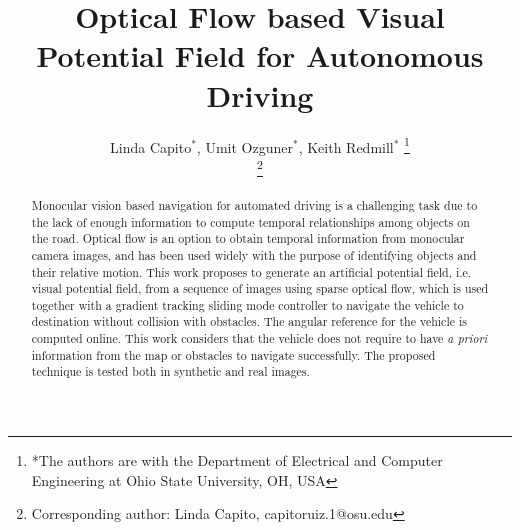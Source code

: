 \documentclass[letterpaper, 10 pt, conference]{ieeeconf}  %
\title{\LARGE \bf
Optical Flow based Visual Potential Field for Autonomous Driving}
\author{
Linda Capito$^*$, Umit Ozguner$^*$, Keith Redmill$^*$
\thanks{*The authors are with the Department of Electrical and Computer Engineering at Ohio State University, OH, USA} \\
\thanks{Corresponding author: Linda Capito, capitoruiz.1@osu.edu}}
\begin{document}
\maketitle
\thispagestyle{empty}
\pagestyle{empty}

\begin{abstract}

Monocular vision based navigation for automated driving is a challenging task due to the lack of enough information to compute temporal relationships among objects on the road. Optical flow is an option to obtain temporal information from monocular camera images, and has been used widely with the purpose of identifying objects and their relative motion. This work proposes to generate an artificial potential field, i.e. visual potential field, from a sequence of images using sparse optical flow, which is used together with a gradient tracking sliding mode controller to navigate the vehicle to destination without collision with obstacles. The angular reference for the vehicle is computed online. This work considers that the vehicle does not require to have \textit{a priori} information from the map or obstacles to navigate successfully. The proposed technique is tested both in synthetic and real images.




\end{abstract}


\end{document}
